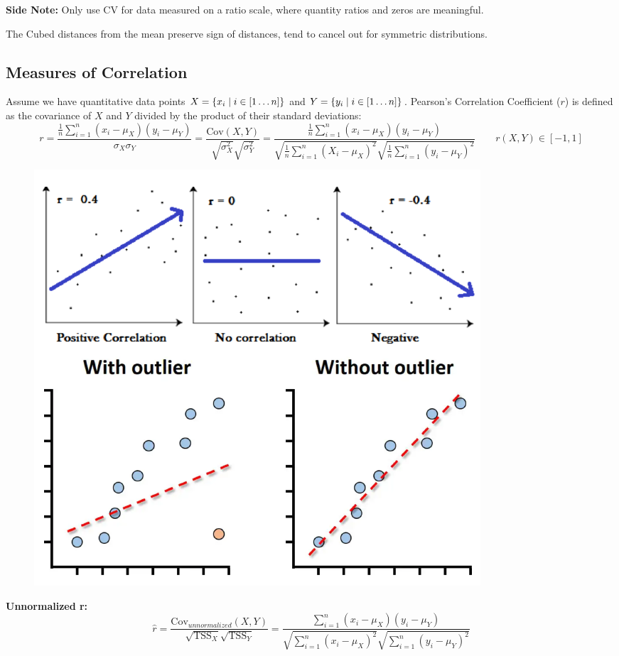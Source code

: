 \documentclass{article}
\begin{document}
\textbf{Side Note: }Only use CV for data measured on a ratio scale, where quantity ratios and zeros are meaningful.


The Cubed distances from the mean preserve sign of distances, tend to cancel out for symmetric distributions.


\subsection*{Measures of Correlation}
Assume we have quantitative data points $X = \{x_i \mid i \in [1\dots n]\}$ and $Y = \{y_i \mid i \in [1\dots n]\}$. Pearson’s Correlation Coefficient ($r$) is defined as the covariance of $X$ and $Y$ divided by the product of their standard deviations:
\[
r = \frac{ \frac{1}{n} \sum_{i=1}^n (x_i - \mu_X)(y_i - \mu_Y)}{\sigma_X  \sigma_Y} = \frac{\text{Cov}(X,Y)}{\sqrt{\sigma_X^2}  \sqrt{\sigma_Y^2}} = \frac{\frac{1}{n} \sum_{i=1}^n (x_i - \mu_X)(y_i - \mu_Y)}{\sqrt{\frac{1}{n} \sum_{i=1}^n (X_i - \mu_X)^2} \sqrt{\frac{1}{n} \sum_{i=1}^n (y_i - \mu_Y)^2}} \quad \quad \boxed{r(X,Y) \in  [-1,1]}
\]
\begin{figure}[H]
    \includegraphics[width=0.3\linewidth]{images/pearson.png}
\end{figure}

\textbf{Unnormalized r:}
\[
\hat{r} = \frac{\text{Cov}_{unnormalized}(X,Y)}{\sqrt{\text{TSS}_X} \sqrt{\text{TSS}_Y}} = \frac{\sum_{i=1}^n (x_i - \mu_X)(y_i - \mu_Y)}{\sqrt{\sum_{i=1}^n (x_i - \mu_X)^2} \sqrt{\sum_{i=1}^n (y_i - \mu_Y)^2}}
\]
\end{document}
